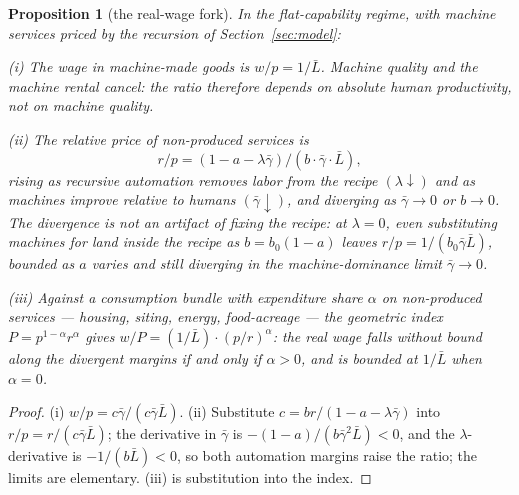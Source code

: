 \documentclass[12pt]{article}
\theoremstyle{plain}
\newtheorem{proposition}{Proposition}
\begin{document}
\begin{proposition}[the real-wage fork]\label{prop:fork}
In the flat-capability regime, with machine services priced by the recursion of Section~\ref{sec:model}:

(i) The wage in machine-made goods is $w/p = 1/\bar{L}$. Machine quality and the machine rental cancel: the ratio therefore depends on absolute human productivity, not on machine quality.

(ii) The relative price of non-produced services is
\begin{equation}\label{eq:fork-price}
r/p = (1 - a - \lambda \bar{\gamma}) / (b\cdot \bar{\gamma}\cdot \bar{L}),
\end{equation}
rising as recursive automation removes labor from the recipe $(\lambda\downarrow)$ and as machines improve relative to humans $(\bar{\gamma}\downarrow)$, and diverging as $\bar{\gamma}\to0$ or $b\to0$. The divergence is not an artifact of fixing the recipe: at $\lambda=0$, even substituting machines for land inside the recipe as $b=b_0(1-a)$ leaves $r/p=1/(b_0\bar{\gamma}\bar{L})$, bounded as $a$ varies and still diverging in the machine-dominance limit $\bar{\gamma}\to0$.

(iii) Against a consumption bundle with expenditure share $\alpha$ on non-produced services --- housing, siting, energy, food-acreage --- the geometric index $P = p^{1-\alpha}r^{\alpha}$ gives $w/P = (1/\bar{L})\cdot (p/r)^{\alpha}$: the real wage falls without bound along the divergent margins if and only if $\alpha > 0$, and is bounded at $1/\bar{L}$ when $\alpha = 0$.
\end{proposition}

\begin{proof}
(i) $w/p = c\bar{\gamma}/(c\bar{\gamma}\bar{L})$. (ii) Substitute $c = br/(1-a-\lambda \bar{\gamma})$ into $r/p = r/(c\bar{\gamma}\bar{L})$; the derivative in $\bar{\gamma}$ is $-(1-a)/(b\bar{\gamma}^2\bar{L}) < 0$, and the $\lambda$-derivative is $-1/(b\bar{L}) < 0$, so both automation margins raise the ratio; the limits are elementary. (iii) is substitution into the index.
\end{proof}
\end{document}
